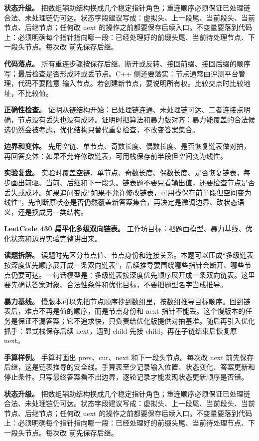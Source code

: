 \textbf{状态升级。} 把数组辅助结构换成几个稳定指针角色；重连顺序必须保证已处理链合法、未处理链仍可达。状态字段建议写成：虚拟头、上一段尾、当前段头、当前节点、后继节点；任何改 next 的操作之前都要保存后续入口。不变量要落到代码上：必须明确每个指针指向哪一段：已经处理好的前缀头尾、当前待处理节点、下一段头节点。每次改  前先保存后继。

\textbf{代码落点。} 所有重连步骤按保存后继、断开或反转、接回前缀、接回后缀的顺序写；最后检查是否形成环或丢节点。C++ 侧还要落实：节点通常由评测平台管理，代码不要随意  输入节点。若创建新节点，要说明所有权。比较交点时比较地址，不比较值。

\textbf{正确性检查。} 证明从链结构开始：已处理链连通、未处理链可达、二者连接点明确，节点没有丢失也没有成环。证明时把算法和暴力版对齐：暴力能覆盖的合法候选仍然会被考虑，优化结构只替代重复检查，不改变答案集合。

\textbf{边界和变体。} 先用空链、单节点、奇数长度、偶数长度、是否恢复链表做对拍，再回答变体：如果不允许修改链表，可用栈保存前半段但空间变为线性。

\textbf{实验复盘。} 实验时覆盖空链、单节点、奇数长度、偶数长度、是否恢复链表，每步画出前驱、当前、后继和下一段头。链表题不要只看输出值，还要检查节点是否丢失或成环。如果追问变成“如果不允许修改链表，可用栈保存前半段但空间变为线性”，先判断原状态是否仍然覆盖新答案集合，再决定是微调边界、改状态语义，还是换成另一类结构。

\noindent\textbf{LeetCode 430 扁平化多级双向链表。} 工作坊目标：把题面模型、暴力基线、优化状态和边界实验完整讲出来。

\textbf{读题拆解。} 读题时先区分节点值、节点身份和连接关系。本题可以压成“多级链表按深度优先顺序展开成一条双向链表”，后续推导要围绕哪些指针会断开、哪些节点仍要可达。一句话模型是：多级链表按深度优先顺序展开成一条双向链表。这里要先确认答案对象、合法性条件和优化目标，不要把题型名字当成推导。

\textbf{暴力基线。} 慢版本可以先把节点顺序抄到数组里，按数组推导目标顺序。回到链表后，难点不再是值的顺序，而是节点身份和 next 指针不能丢。这个慢版本的任务是保证不漏答案；它不追求快，只负责给优化版提供对拍基准。随后再引入优化抓手：显式栈保存后续 next，遇到 child 先接 child，再在子链结束后恢复原 next。

\textbf{手算样例。} 手算时画出 prev、cur、next 和下一段头节点。每次改 next 前先保存后继，这是链表推导的安全线。手算表至少记录输入位置、状态变化、答案更新和停止条件。只写最终答案看不出边界，逐轮记录才能发现状态更新顺序是否错。

\textbf{状态升级。} 把数组辅助结构换成几个稳定指针角色；重连顺序必须保证已处理链合法、未处理链仍可达。状态字段建议写成：虚拟头、上一段尾、当前段头、当前节点、后继节点；任何改 next 的操作之前都要保存后续入口。不变量要落到代码上：必须明确每个指针指向哪一段：已经处理好的前缀头尾、当前待处理节点、下一段头节点。每次改  前先保存后继。

